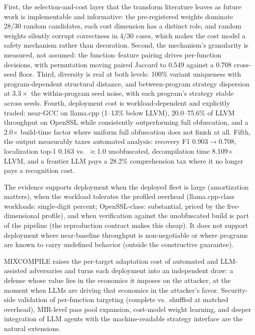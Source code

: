 \documentclass[pdflatex,sn-mathphys-num]{sn-jnl}
\theoremstyle{thmstyleone}%
\theoremstyle{thmstyletwo}%
\theoremstyle{thmstylethree}%
\begin{document}
First, the selection-and-cost layer that the transform literature leaves as future
work is implementable and informative: the pre-registered weights dominate 28/30
random candidates, each cost dimension has a distinct role, and random weights
silently corrupt correctness in 4/30 cases, which makes the cost model a safety
mechanism rather than decoration. Second, the mechanism's granularity is measured,
not assumed: the function--feature pairing drives per-function decisions, with
permutation moving paired Jaccard to 0.549 against a 0.708 cross-seed floor. Third,
diversity is real at both levels: 100\% variant uniqueness with program-dependent
structural distance, and between-program strategy dispersion at $3.3\times$ the
within-program seed noise, with each program's strategy stable across seeds. Fourth,
deployment cost is workload-dependent and explicitly traded: near-GCC on llama.cpp
(1--13\% below LLVM), 20.0--75.6\% of LLVM throughput on OpenSSL while consistently
outperforming full obfuscation, and a 2.0$\times$ build-time factor where uniform
full obfuscation does not finish at all. Fifth, the output measurably taxes
automated analysis: recovery F1 0.903$\to$0.708, localization top-1 0.163 vs.\
$\approx$1.0 unobfuscated, decompilation time 8.109$\times$ LLVM, and a frontier
LLM pays a 28.2\% comprehension tax where it no longer pays a recognition cost.

The evidence supports deployment when the deployed fleet is large (amortization
matters), when the workload tolerates the profiled overhead (llama.cpp-class
workloads: single-digit percent; OpenSSL-class: substantial, priced by the
five-dimensional profile), and when verification against the unobfuscated build is
part of the pipeline (the reproduction contract makes this cheap). It does not
support deployment where near-baseline throughput is non-negotiable or where
programs are known to carry undefined behavior (outside the constructive
guarantee).

MIXCOMPILE raises the per-target adaptation cost of automated and LLM-assisted
adversaries and turns each deployment into an independent draw: a defense whose
value lies in the economics it imposes on the attacker, at the moment when
LLMs are driving that economics in the attacker's favor. Security-side
validation of per-function targeting (complete vs.\ shuffled at matched overhead),
MIR-level pass pool expansion, cost-model weight learning, and deeper integration
of LLM agents with the machine-readable strategy interface are the natural
extensions.
\end{document}
